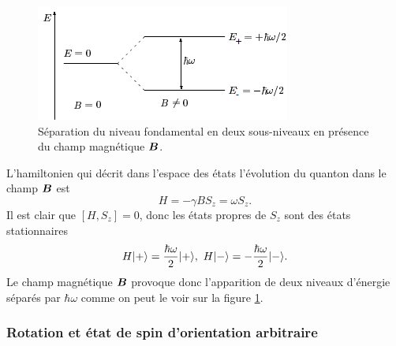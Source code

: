 \begin{figure}
\includegraphics[scale=.9]{graphics/EieSpin.png}
\caption{Séparation du niveau fondamental en deux sous-niveaux en présence du
champ magnétique $\boldsymbol{B}$.}
\label{fig:EieSpin}
\end{figure}
L'hamiltonien qui décrit dans l'espace des états l'évolution du quanton dans
le champ $\boldsymbol{B}$ est
\begin{equation}
H=-\gamma BS_z=\omega S_z.
\end{equation}
Il est clair que $[H,S_z]=0$, donc les états propres de $S_z$ sont
des états stationnaires%
\begin{equation}
H\vert+\rangle=\frac{\hbar\omega}{2}\vert+\rangle,~H\vert-\rangle=-\frac{\hbar\omega}{2}\vert-\rangle.
\end{equation}
Le champ magnétique $\boldsymbol{B}$ provoque donc l'apparition de deux niveaux
d'énergie séparés par $\hbar\omega$ comme on peut le voir sur la figure
\ref{fig:EieSpin}.

\subsubsection{Rotation et état de spin d'orientation arbitraire}
\label{sec:SpinArbitr1}


